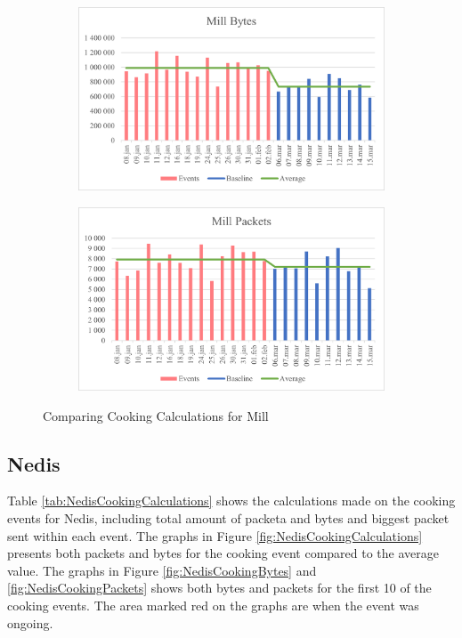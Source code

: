 \begin{figure}[H]
    \centering
    \begin{subfigure}{0.49\textwidth}
        \centering
        \includegraphics[width=1\hsize]{figures/Mill_Comparing_Cooking_Calculations_Bytes.png} 
    \end{subfigure}
    \begin{subfigure}{0.49\textwidth}
        \centering
        \includegraphics[width=1\hsize]{figures/Mill_Comparing_Cooking_Calculations_Packets.png} 
    \end{subfigure}
    \caption{Comparing Cooking Calculations for Mill}
    \label{fig:MillComparingCookingCalc
    ulations}
\end{figure}

\newpage
\subsection{Nedis}
Table \ref{tab:NedisCookingCalculations} shows the calculations made on the cooking events for Nedis, including total amount of packeta and bytes and biggest packet sent within each event. The graphs in Figure \ref{fig:NedisCookingCalculations} presents both packets and bytes for the cooking event compared to the average value. The graphs in Figure \ref{fig:NedisCookingBytes} and \ref{fig:NedisCookingPackets} shows both bytes and packets for the first 10 of the cooking events. The area marked red on the graphs are when the event was ongoing.

